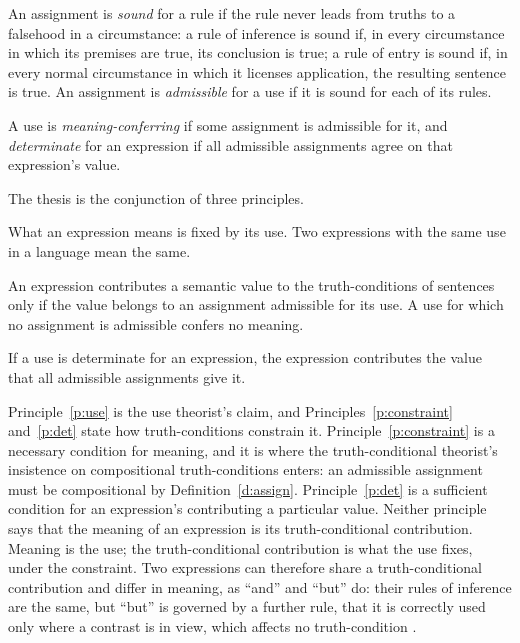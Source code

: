 \documentclass{situationist-preprint}
\begin{document}
\begin{definition}[Soundness]\label{d:sound}
An assignment is \emph{sound} for a rule if the rule never leads from truths to a falsehood in a circumstance: a rule of inference is sound if, in every circumstance in which its premises are true, its conclusion is true; a rule of entry is sound if, in every normal circumstance in which it licenses application, the resulting sentence is true. An assignment is \emph{admissible} for a use if it is sound for each of its rules.
\end{definition}

\begin{definition}\label{d:conf}
A use is \emph{meaning-conferring} if some assignment is admissible for it, and \emph{determinate} for an expression if all admissible assignments agree on that expression's value.
\end{definition}

The thesis is the conjunction of three principles.

\begin{principle}[Use]\label{p:use}
What an expression means is fixed by its use. Two expressions with the same use in a language mean the same.
\end{principle}

\begin{principle}\label{p:constraint}
An expression contributes a semantic value to the truth-conditions of sentences only if the value belongs to an assignment admissible for its use. A use for which no assignment is admissible confers no meaning.
\end{principle}

\begin{principle}[Determination]\label{p:det}
If a use is determinate for an expression, the expression contributes the value that all admissible assignments give it.
\end{principle}

Principle~\ref{p:use} is the use theorist's claim, and Principles~\ref{p:constraint} and~\ref{p:det} state how truth-conditions constrain it. Principle~\ref{p:constraint} is a necessary condition for meaning, and it is where the truth-conditional theorist's insistence on compositional truth-conditions enters: an admissible assignment must be compositional by Definition~\ref{d:assign}. Principle~\ref{p:det} is a sufficient condition for an expression's contributing a particular value. Neither principle says that the meaning of an expression is its truth-conditional contribution. Meaning is the use; the truth-conditional contribution is what the use fixes, under the constraint. Two expressions can therefore share a truth-conditional contribution and differ in meaning, as \enquote{and} and \enquote{but} do: their rules of inference are the same, but \enquote{but} is governed by a further rule, that it is correctly used only where a contrast is in view, which affects no truth-condition \citep{Frege1892}.
\end{document}
